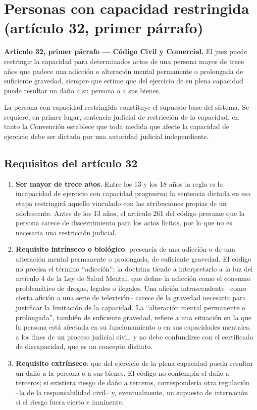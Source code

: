 \documentclass[12pt,oneside]{book}
\begin{document}
\section{Personas con capacidad restringida (artículo 32, primer párrafo)}

\begin{important}
\textbf{Artículo 32, primer párrafo --- Código Civil y Comercial.} El juez puede restringir la capacidad para determinados actos de una persona mayor de trece años que padece una adicción o alteración mental permanente o prolongada de suficiente gravedad, siempre que estime que del ejercicio de su plena capacidad puede resultar un daño a su persona o a sus bienes.
\end{important}

La persona con capacidad restringida constituye el supuesto base del sistema. Se requiere, en primer lugar, sentencia judicial de restricción de la capacidad, en tanto la Convención establece que toda medida que afecte la capacidad de ejercicio debe ser dictada por una autoridad judicial independiente.

\subsection{Requisitos del artículo 32}

\begin{enumerate}
\item \textbf{Ser mayor de trece años.} Entre los 13 y los 18 años la regla es la incapacidad de ejercicio con capacidad progresiva; la sentencia dictada en esa etapa restringirá aquello vinculado con las atribuciones propias de un adolescente. Antes de los 13 años, el artículo 261 del código presume que la persona carece de discernimiento para los actos lícitos, por lo que no es necesaria una restricción judicial.
\item \textbf{Requisito intrínseco o biológico}: presencia de una adicción o de una alteración mental permanente o prolongada, de suficiente gravedad. El código no precisa el término ``adicción''; la doctrina tiende a interpretarlo a la luz del artículo 4 de la Ley de Salud Mental, que define la adicción como el consumo problemático de drogas, legales o ilegales. Una afición intrascendente --como cierta afición a una serie de televisión-- carece de la gravedad necesaria para justificar la limitación de la capacidad. La ``alteración mental permanente o prolongada'', también de suficiente gravedad, refiere a una situación en la que la persona está afectada en su funcionamiento o en sus capacidades mentales, a los fines de un proceso judicial civil, y no debe confundirse con el certificado de discapacidad, que es un concepto distinto.
\item \textbf{Requisito extrínseco}: que del ejercicio de la plena capacidad pueda resultar un daño a la persona o a sus bienes. El código no contempla el daño a terceros; si existiera riesgo de daño a terceros, correspondería otra regulación --la de la responsabilidad civil-- y, eventualmente, un supuesto de internación si el riesgo fuera cierto e inminente.
\end{enumerate}
\end{document}
